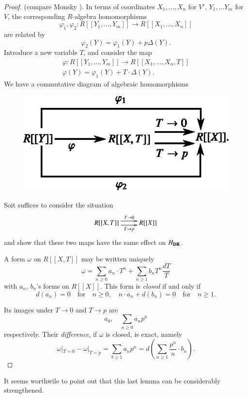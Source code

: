 \begin{proof}
(compare Monsky \cite{art6-key39}). In terms of coordinates $X_{1},\ldots,X_{n}$ for $V'$, $Y_{1},\ldots Y_{m}$ for $V$, the corresponding $R$-algebra homomorphisms
$$
\varphi_{1},\varphi_{2} : R[[Y_{1},\ldots,Y_{m}]]\to R[[X_{1},\ldots,X_{n}]]
$$
are related by
$$
\varphi_{2}(Y)=\varphi_{1}(Y)+p\Delta (Y).
$$
Introduce a new variable $T$, and consider the map 
\begin{gather*}
\varphi : R[[Y_{1},\ldots,Y_{m}]]\to R[[X_{1},\ldots,X_{n},T]]\\[3pt]
\varphi(Y)=\varphi_{1}(Y)+T\cdot \Delta(Y).
\end{gather*}
We have a commutative diagram of algebraic homomorphisms
\begin{figure}[H]
\centering
\includegraphics{chap6/fig11.eps}
\end{figure}
So\pageoriginale it suffices to consider the situation
\[
\xymatrix{
R[[X,T]]\ar@<.3em>[r]^-{T\to 0} \ar@<-.3em>[r]_-{T\to p} & R[[X]]
}
\]
and show that these two maps have the same effect on $H_{\mathbf{DR}}$.

A form $\omega$ on $R[[X,T]]$ may be written uniquely
$$
\omega = \sum\limits_{n\geq 0} a_{n}\cdot T^{n}+\sum\limits_{n\geq 1}b_{n}T^{n}\dfrac{dT}{T}
$$
with $a_{n}$, $b_{n}$'s forms on $R[[X]]$. This form is {\em closed} if and only if
$$
d(a_{n})=0\quad\text{for}\quad n\geq 0,\quad n\cdot a_{n}+d(b_{n})=0\quad \text{for}\quad n\geq 1.
$$

Its images under $T\to 0$ and $T\to p$ are
$$
a_{0},\quad \sum\limits_{n\geq 0} a_{n}p^{n}
$$
respectively. Their {\em difference}, if $\omega$ is closed, is exact, namely
$$
\omega|_{T=0}-\omega|_{T=p}=\sum\limits_{b\geq 1}a_{n}p^{n}=d\left(\sum\limits_{n\geq 1}\frac{p^{n}}{n}\cdot b_{n}\right).
$$
\end{proof}

It seems worthwile to point out that this last lemma can be considerably strengthened.

